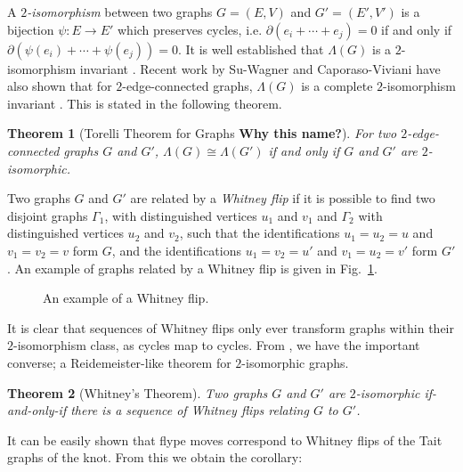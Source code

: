 \documentclass[12pt]{report}
\newcommand{\notered}[1]{{\color{Red} \textbf{#1}}}
\newtheorem*{theorem}{Theorem}
\begin{document}
A \textit{$2$-isomorphism} between two graphs $G = (E, V)$ and $G' = (E', V')$ is a bijection \({\psi: E \longrightarrow E'}\) which preserves cycles, i.e. $\partial(e_{i} + \cdots + e_{j}) = 0$ if and only if $\partial\left(\psi(e_{i}) + \cdots + \psi(e_{j})\right) = 0$. It is well established that $\Lambda(G)$ is a $2$-isomorphism invariant \parencite{lattice-of-flows-cuts}. Recent work by Su-Wagner and Caporaso-Viviani have also shown that for $2$-edge-connected graphs, $\Lambda(G)$ is a complete $2$-isomorphism invariant \cites[Theorem 3.1.1]{torelli-for-graphs-tropical-curves}[Theorem 1]{lattice-of-flows-regular-matroid}. This is stated in the following theorem.


\begin{theorem}[Torelli Theorem for Graphs \notered{Why this name?}]
For two $2$-edge-connected graphs $G$ and $G'$, $\Lambda(G) \cong \Lambda(G')$ if and only if $G$ and $G'$ are $2$-isomorphic.
\end{theorem}

Two graphs $G$ and $G'$ are related by a \textit{Whitney flip} if it is possible to find two disjoint graphs $\Gamma_{1}$, with distinguished vertices $u_{1}$ and $v_{1}$ and $\Gamma_{2}$ with distinguished vertices $u_{2}$ and $v_{2}$, such that the identifications $u_{1} = u_{2} = u$ and $v_{1} = v_{2} = v$ form $G$, and the identifications $u_{1} = v_{2} = u'$ and $v_{1} = u_{2} = v'$ form $G'$. An example of graphs related by a Whitney flip is given in Fig.~\ref{fig:whitney_flip}.

\begin{figure}[hbt!]
	\centering
	\def\svgscale{0.5}
	
	
	\caption{An example of a Whitney flip.}
	\label{fig:whitney_flip}
\end{figure}

It is clear that sequences of Whitney flips only ever transform graphs within their $2$-isomorphism class, as cycles map to cycles. From \cite{2-isomorphic-graphs}, we have the important converse; a Reidemeister-like theorem for $2$-isomorphic graphs.

\begin{theorem}[Whitney's Theorem]
Two graphs $G$ and $G'$ are $2$-isomorphic if-and-only-if there is a sequence of Whitney flips relating $G$ to $G'$.
\end{theorem}

It can be easily shown that flype moves correspond to Whitney flips of the Tait graphs of the knot. From this we obtain the corollary:
\end{document}
